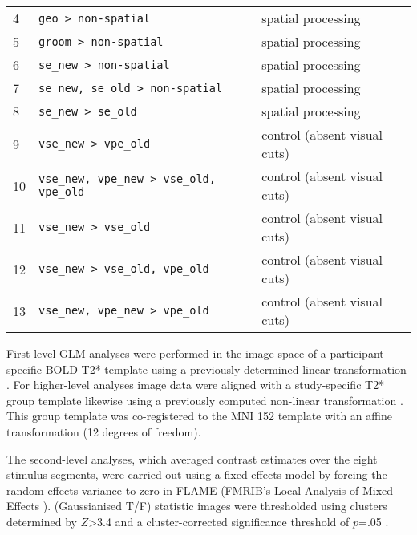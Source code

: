 \documentclass[english,11pt]{article}
\begin{document}
\begin{table*}[tbp]
\begin{tabular}{lll}
4 & \texttt{geo > non-spatial} & spatial processing \tabularnewline
5 & \texttt{groom > non-spatial} & spatial processing \tabularnewline
6 & \texttt{se\_new > non-spatial} & spatial processing \tabularnewline
7 & \texttt{se\_new, se\_old > non-spatial} & spatial processing \tabularnewline
8 & \texttt{se\_new > se\_old} & spatial processing \tabularnewline
9 & \texttt{vse\_new > vpe\_old} & control (absent visual cuts) \tabularnewline
10 & \texttt{vse\_new, vpe\_new > vse\_old, vpe\_old} & control (absent visual cuts) \tabularnewline
11 & \texttt{vse\_new > vse\_old} & control (absent visual cuts) \tabularnewline
12 & \texttt{vse\_new > vse\_old, vpe\_old} & control (absent visual cuts) \tabularnewline
13 & \texttt{vse\_new, vpe\_new > vpe\_old} & control (absent visual cuts) \tabularnewline
\bottomrule
\end{tabular}
\end{table*}


First-level GLM analyses were performed in the image-space of a
participant-specific BOLD T2* template using a previously determined linear
transformation \citep{sengupta2016extension}.
For higher-level analyses image data were aligned with a study-specific T2*
group template likewise using a previously computed non-linear transformation
\citep{hanke2014audiomovie}.
This group template was co-registered to the MNI 152 template with an affine
transformation (12 degrees of freedom).

The second-level analyses, which averaged contrast estimates over the eight
stimulus segments, were carried out using a fixed effects model by forcing the
random effects variance to zero in FLAME (FMRIB's Local Analysis of Mixed
Effects \citep{beckmann2003general, woolrich2004multilevel}).
(Gaussianised T/F) statistic images were thresholded using clusters determined
by $Z$>3.4 and a cluster-corrected significance threshold of $p$=.05
\citep{worsley2001statistical}.
\end{document}
